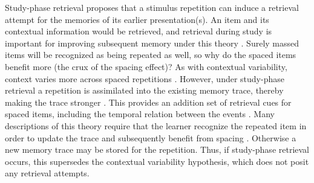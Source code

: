 


Study-phase retrieval proposes that a stimulus repetition can induce a retrieval attempt for the memories of its earlier presentation(s).  An item and its contextual information would be retrieved, and retrieval during study is important for improving subsequent memory under this theory \cite{Gree1989a,ThioDAgo1976}.  Surely massed items will be recognized as being repeated as well, so why do the spaced items benefit more (the crux of the spacing effect)?  As with contextual variability, context varies more across spaced repetitions \cite{Melt1967}.  However, under study-phase retrieval a repetition is assimilated into the existing memory trace, thereby making the trace stronger \cite{Raai2003}.
This provides an addition set of retrieval cues for spaced items, including the temporal relation between the events \cite{Gree1989a}.  Many descriptions of this theory require that the learner recognize the repeated item in order to update the trace and subsequently benefit from spacing \cite{HintBloc1973,HintEtal1975a,JohnUhl1976,Raai2003}.  Otherwise a new memory trace may be stored for the repetition.  Thus, if study-phase retrieval occurs, this supersedes the contextual variability hypothesis, which does not posit any retrieval attempts.


